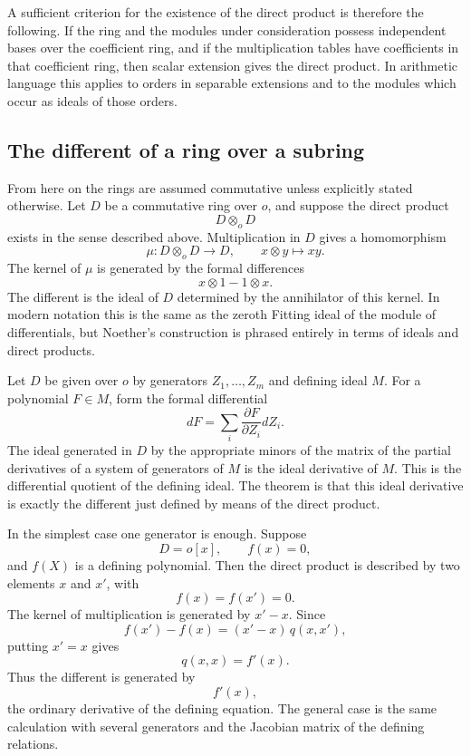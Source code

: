 \documentclass[12pt]{article}
\begin{document}
A sufficient criterion for the existence of the direct product is therefore the following. If the ring and the modules under consideration possess independent bases over the coefficient ring, and if the multiplication tables have coefficients in that coefficient ring, then scalar extension gives the direct product. In arithmetic language this applies to orders in separable extensions and to the modules which occur as ideals of those orders.

\subsection{The different of a ring over a subring}

From here on the rings are assumed commutative unless explicitly stated otherwise. Let \(D\) be a commutative ring over \(o\), and suppose the direct product
\[
  D\otimes_o D
\]
exists in the sense described above. Multiplication in \(D\) gives a homomorphism
\[
  \mu:D\otimes_o D\longrightarrow D,
  \qquad x\otimes y\mapsto xy.
\]
The kernel of \(\mu\) is generated by the formal differences
\[
  x\otimes1-1\otimes x.
\]
The different is the ideal of \(D\) determined by the annihilator of this kernel. In modern notation this is the same as the zeroth Fitting ideal of the module of differentials, but Noether's construction is phrased entirely in terms of ideals and direct products.

Let \(D\) be given over \(o\) by generators \(Z_1,
\ldots,Z_m\) and defining ideal \(M\). For a polynomial \(F\in M\), form the formal differential
\[
  dF=\sum_i \frac{\partial F}{\partial Z_i}
  dZ_i.
\]
The ideal generated in \(D\) by the appropriate minors of the matrix of the partial derivatives of a system of generators of \(M\) is the ideal derivative of \(M\). This is the differential quotient of the defining ideal. The theorem is that this ideal derivative is exactly the different just defined by means of the direct product.

In the simplest case one generator is enough. Suppose
\[
  D=o[x],\qquad f(x)=0,
\]
and \(f(X)\) is a defining polynomial. Then the direct product is described by two elements \(x\) and \(x'\), with
\[
  f(x)=f(x')=0.
\]
The kernel of multiplication is generated by \(x'-x\). Since
\[
  f(x')-f(x)=(x'-x)\,q(x,x'),
\]
putting \(x'=x\) gives
\[
  q(x,x)=f'(x).
\]
Thus the different is generated by
\[
  f'(x),
\]
the ordinary derivative of the defining equation. The general case is the same calculation with several generators and the Jacobian matrix of the defining relations.
\end{document}
